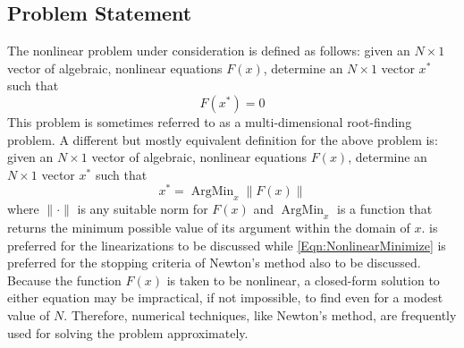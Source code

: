 \documentclass[Prelim,12pt]{WisconsinThesis}
\newcommand{\by}    {\!\times\!}
\DeclareMathOperator*{\ArgMin}{ArgMin}
\begin{document}
\subsection{Problem Statement}
The nonlinear problem under consideration is defined as follows: given an $N \by 1$ vector of algebraic, nonlinear equations $F(x)$, determine an $N \by 1$ vector $x^*$ such that
\begin{equation}
    F(x^*) = 0
    \label{Eqn:NonlinearRootFind}
\end{equation}
This problem is sometimes referred to as a multi-dimensional root-finding problem.
A different but mostly equivalent definition for the above problem is: given an $N \by 1$ vector of algebraic, nonlinear equations $F(x)$, determine an $N \by 1$ vector $x^*$ such that
\begin{equation}
    x^* = \ArgMin_{x} \|F(x)\|
    \label{Eqn:NonlinearMinimize}
\end{equation}
where $\|\cdot\|$ is any suitable norm for $F(x)$ and $\ArgMin_x$ is a function that returns the minimum possible value of its argument within the domain of $x$.
 is preferred for the linearizations to be discussed while \cref{Eqn:NonlinearMinimize} is preferred for the stopping criteria of Newton's method also to be discussed.
Because the function $F(x)$ is taken to be nonlinear, a closed-form solution to either equation may be impractical, if not impossible, to find even for a modest value of $N$.
Therefore, numerical techniques, like Newton's method, are frequently used for solving the problem approximately.
\end{document}
